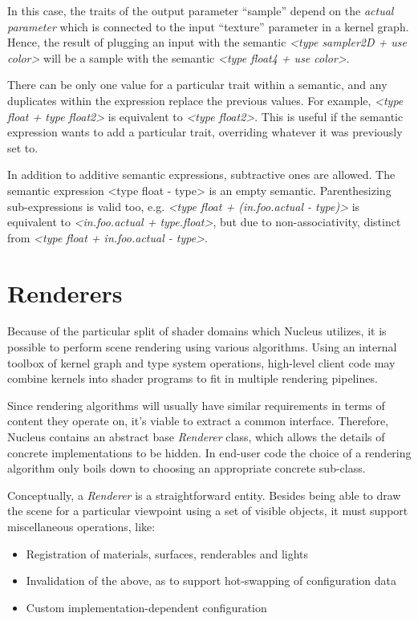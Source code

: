 
In this case, the traits of the output parameter ``sample'' depend on the \emph{actual parameter} which is connected to the input ``texture'' parameter in a kernel graph. Hence, the result of plugging an input with the semantic \emph{<type sampler2D + use color>} will be a sample with the semantic \emph{<type float4 + use color>}.

There can be only one value for a particular trait within a semantic, and any duplicates within the expression replace the previous values. For example, \emph{<type float + type float2>} is equivalent to \emph{<type float2>}. This is useful if the semantic expression wants to add a particular trait, overriding whatever it was previously set to.

In addition to additive semantic expressions, subtractive ones are allowed. The semantic expression <type float - type> is an empty semantic. Parenthesizing sub-expressions is valid too, e.g. \emph{<type float + (in.foo.actual - type)>} is equivalent to \emph{<in.foo.actual + type.float>}, but due to non-associativity, distinct from \emph{<type float + in.foo.actual - type>}.

\section{Renderers}
\label{sec:Renderers}

Because of the particular split of shader domains which Nucleus utilizes, it is possible to perform scene rendering using various algorithms. Using an internal toolbox of kernel graph and type system operations, high-level client code may combine kernels into shader programs to fit in multiple rendering pipelines.

Since rendering algorithms will usually have similar requirements in terms of content they operate on, it's viable to extract a common interface. Therefore, Nucleus contains an abstract base \emph{Renderer} class, which allows the details of concrete implementations to be hidden. In end-user code the choice of a rendering algorithm only boils down to choosing an appropriate concrete sub-class.

Conceptually, a \emph{Renderer} is a straightforward entity. Besides being able to draw the scene for a particular viewpoint using a set of visible objects, it must support miscellaneous operations, like:

\begin{itemize}
\item Registration of materials, surfaces, renderables and lights
\item Invalidation of the above, as to support hot-swapping of configuration data
\item Custom implementation-dependent configuration
\end{itemize}

